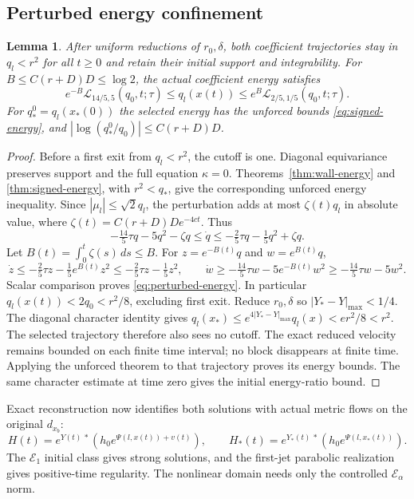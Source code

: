 \documentclass[11pt]{amsart}
\newtheorem{lemma}[theorem]{Lemma}
\theoremstyle{definition}
\theoremstyle{remark}
\begin{document}
\subsection{Perturbed energy confinement}
\begin{lemma}\label{lem:perturbed-energy}
After uniform reductions of $r_0,\delta$, both coefficient
trajectories stay in $q_l<r^2$ for all $t\ge0$ and retain
their initial support and integrability. For
$B\le C(r+D)D\le\log2$, the actual coefficient energy satisfies
\begin{equation}\label{eq:perturbed-energy}
 e^{-B}\mathcal L_{14/5,5}(q_0,t;\tau)\le q_l(x(t))
                \le e^B\mathcal L_{2/5,1/5}(q_0,t;\tau).
\end{equation}
For $q_*^0=q_l(x_*(0))$ the selected energy has the unforced
bounds \eqref{eq:signed-energy}, and
$|\log(q_*^0/q_0)|\le C(r+D)D$.
\end{lemma}
\begin{proof}
Before a first exit from $q_l<r^2$, the cutoff is one.
Diagonal equivariance preserves support and the full equation
$\kappa=0$. Theorems~\ref{thm:wall-energy} and
\ref{thm:signed-energy}, with $r^2<q_*$, give the corresponding
unforced energy inequality. Since $|\mu_l|\le\sqrt2q_l$,
the perturbation adds at most $\zeta(t)q_l$ in absolute value,
where $\zeta(t)=C(r+D)D e^{-4ct}$. Thus
\[
 -\tfrac{14}{5}\tau q-5q^2-\zeta q
 \le\dot q\le-\tfrac25\tau q-\tfrac15q^2+\zeta q .
\]
Let $B(t)=\int_0^t\zeta(s)\,ds\le B$.
For $z=e^{-B(t)}q$ and $w=e^{B(t)}q$,
\[
 \dot z\le-\tfrac25\tau z-\tfrac15e^{B(t)}z^2
            \le-\tfrac25\tau z-\tfrac15z^2,\qquad
 \dot w\ge-\tfrac{14}{5}\tau w-5e^{-B(t)}w^2
            \ge-\tfrac{14}{5}\tau w-5w^2 .
\]
Scalar comparison proves \eqref{eq:perturbed-energy}.
In particular $q_l(x(t))<2q_0<r^2/8$, excluding first exit.
Reduce $r_0,\delta$ so
$|Y_*-Y|_{\max}<1/4$. The diagonal character identity gives
$q_l(x_*)\le e^{4|Y_*-Y|_{\max}}q_l(x)<er^2/8<r^2$.
The selected trajectory therefore also sees no cutoff.
The exact reduced velocity remains bounded on each finite
time interval; no block disappears at finite time.
Applying the unforced theorem to that trajectory proves its
energy bounds. The same character estimate at time zero
gives the initial energy-ratio bound.
\end{proof}

Exact reconstruction now identifies both solutions with
actual metric flows on the original $d_{x_b}$:
\begin{equation}\label{eq:two-metrics}
 H(t)=e^{Y(t)\,*}(h_0e^{\Psi(l,x(t))+v(t)}),\qquad
 H_*(t)=e^{Y_*(t)\,*}(h_0e^{\Psi(l,x_*(t))}).
\end{equation}
The $\mathcal E_1$ initial class gives strong solutions, and
the first-jet parabolic realization gives positive-time
regularity. The nonlinear domain needs only the controlled
$\mathcal E_\alpha$ norm.
\end{document}
